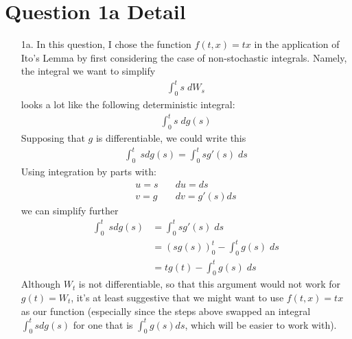 \documentclass[12pt]{article}
\theoremstyle{plain}
\theoremstyle{definition}
\theoremstyle{remark}
\begin{document}
\section{Question 1a Detail}
\begin{enumerate}
  \item[1a.] In this question, I chose the function $f(t,x)=tx$ in the
    application of Ito's Lemma by first considering the case of
    non-stochastic integrals. Namely, the integral we want to simplify
    \begin{align*}
      \int^t_0 s \;dW_s
    \end{align*}
    looks a lot like the following deterministic integral:
    \begin{align*}
      \int^t_0 s \;dg(s)
    \end{align*}
    Supposing that $g$ is differentiable, we could write this
    \begin{align*}
      \int^t_0 \;s dg(s)
      = \int^t_0 s g'(s) \;ds
    \end{align*}
    Using integration by parts with:
    \begin{align*}
      u = s &\quad du = ds \\
      v = g &\quad dv = g'(s) ds
    \end{align*}
    we can simplify further
    \begin{align*}
      \int^t_0 \;s dg(s)
      &= \int^t_0 s g'(s) \;ds \\
      &= \left( sg(s)\right)^t_0 - \int^t_0 g(s) \;ds \\
      &= tg(t) - \int^t_0 g(s) \;ds
    \end{align*}
    Although $W_t$ is not differentiable, so that this argument would
    not work for $g(t) = W_t$, it's at least suggestive that we might
    want to use $f(t,x) = tx$ as our function (especially since the
    steps above swapped an integral $\int^t_0 sdg(s)$ for one that is
    $\int^t_0 g(s) ds$, which will be easier to work with).


\end{enumerate}
\end{document}
